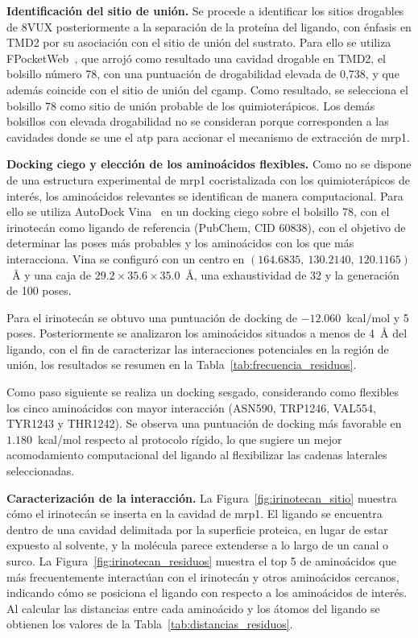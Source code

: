 \textbf{Identificación del sitio de unión.} Se procede a identificar los sitios drogables de 8VUX posteriormente a la separación de la proteína del ligando, con énfasis en TMD2 por su asociación con el sitio de unión del sustrato. Para ello se utiliza FPocketWeb~\cite{kochnev2022fpocketweb}, que arrojó como resultado una cavidad drogable en TMD2, el bolsillo número 78, con una puntuación de drogabilidad elevada de 0,738, y que además coincide con el sitio de unión del \gls{cgamp}. Como resultado, se selecciona el bolsillo 78 como sitio de unión probable de los quimioterápicos. Los demás bolsillos con elevada drogabilidad no se consideran porque corresponden a las cavidades donde se une el \gls{atp} para accionar el mecanismo de extracción de \gls{mrp1}.

\textbf{Docking ciego y elección de los aminoácidos flexibles.} Como no se dispone de una estructura experimental de \gls{mrp1} cocristalizada con los quimioterápicos de interés, los aminoácidos relevantes se identifican de manera computacional. Para ello se utiliza AutoDock Vina~\cite{trott2010vina,eberhardt2021vina} en un docking ciego sobre el bolsillo 78, con el irinotecán como ligando de referencia (PubChem, CID 60838), con el objetivo de determinar las poses más probables y los aminoácidos con los que más interacciona. Vina se configuró con un centro en $(164.6835,\ 130.2140,\ 120.1165)$~Å y una caja de $29.2 \times 35.6 \times 35.0$~Å, una exhaustividad de 32 y la generación de 100 poses.

Para el irinotecán se obtuvo una puntuación de docking de $-12.060$~kcal/mol y 5 poses. Posteriormente se analizaron los aminoácidos situados a menos de 4~Å del ligando, con el fin de caracterizar las interacciones potenciales en la región de unión, los resultados se resumen en la Tabla~\ref{tab:frecuencia_residuos}.



Como paso siguiente se realiza un docking sesgado, considerando como flexibles los cinco aminoácidos con mayor interacción (ASN590, TRP1246, VAL554, TYR1243 y THR1242). Se observa una puntuación de docking más favorable en $1.180$~kcal/mol respecto al protocolo rígido, lo que sugiere un mejor acomodamiento computacional del ligando al flexibilizar las cadenas laterales seleccionadas.

\textbf{Caracterización de la interacción.} La Figura~\ref{fig:irinotecan_sitio} muestra cómo el irinotecán se inserta en la cavidad de \gls{mrp1}. El ligando se encuentra dentro de una cavidad delimitada por la superficie proteica, en lugar de estar expuesto al solvente, y la molécula parece extenderse a lo largo de un canal o surco. La Figura~\ref{fig:irinotecan_residuos} muestra el top 5 de aminoácidos que más frecuentemente interactúan con el irinotecán y otros aminoácidos cercanos, indicando cómo se posiciona el ligando con respecto a los aminoácidos de interés. Al calcular las distancias entre cada aminoácido y los átomos del ligando se obtienen los valores de la Tabla~\ref{tab:distancias_residuos}.

